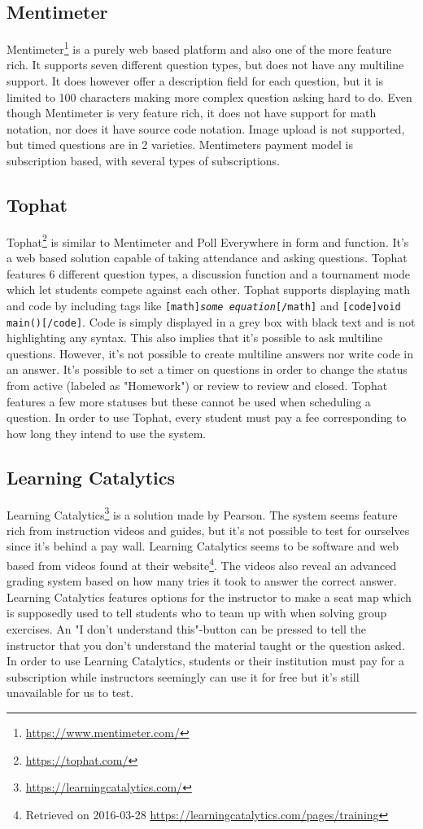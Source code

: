 \subsection*{Mentimeter}
Mentimeter\footnote{\url{https://www.mentimeter.com/}} is a purely web based platform and also one of the more feature rich. It supports seven different question types, but does not have any multiline support. It does however offer a description field for each question, but it is limited to 100 characters making more complex question asking hard to do. Even though Mentimeter is very feature rich, it does not have support for math notation, nor does it have source code notation.  Image upload is not supported, but timed questions are in 2 varieties. Mentimeters payment model is subscription based, with several types of subscriptions. 

\subsection*{Tophat}
Tophat\footnote{\url{https://tophat.com/}} is similar to Mentimeter and Poll Everywhere in form and function. It's a web based solution capable of taking attendance and asking questions. Tophat features 6 different question types, a discussion function and a tournament mode which let students compete against each other. Tophat supports displaying math and code by including tags like \texttt{[math]\emph{some equation}[/math]} and \texttt{[code]void main()[/code]}. Code is simply displayed in a grey box with black text and is not highlighting any syntax. This also implies that it's possible to ask multiline questions. However, it's not possible to create multiline answers nor write code in an answer. It's possible to set a timer on questions in order to change the status from active (labeled as "Homework") or review to review and closed. Tophat features a few more statuses but these cannot be used when scheduling a question. In order to use Tophat, every student must pay a fee corresponding to how long they intend to use the system.

\subsection*{Learning Catalytics}
Learning Catalytics\footnote{\url{https://learningcatalytics.com/}} is a solution made by Pearson. The system seems feature rich from instruction videos and guides, but it's not possible to test for ourselves since it's behind a pay wall. Learning Catalytics seems to be software and web based from videos found at their website\footnote{Retrieved on 2016-03-28 \url{https://learningcatalytics.com/pages/training}}. The videos also reveal an advanced grading system based on how many tries it took to answer the correct answer. Learning Catalytics features options for the instructor to make a seat map which is supposedly used to tell students who to team up with when solving group exercises. An "I don't understand this"-button can be pressed to tell the instructor that you don't understand the material taught or the question asked. In order to use Learning Catalytics, students or their institution must pay for a subscription while instructors seemingly can use it for free but it's still unavailable for us to test.

